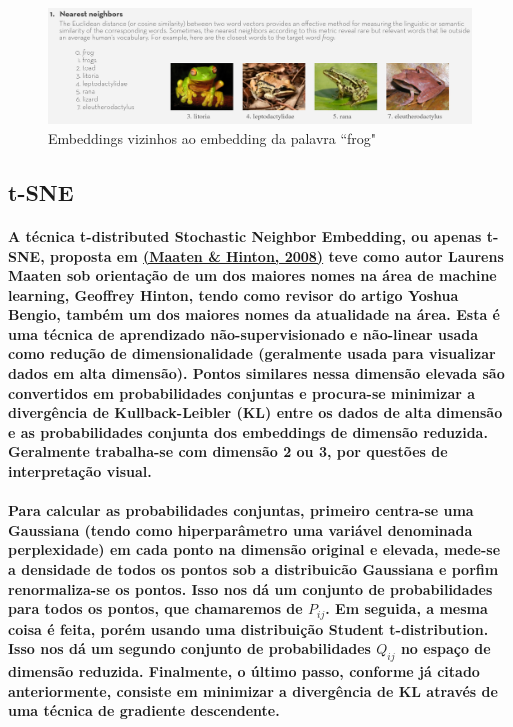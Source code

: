 \documentclass[a4paper]{article}    %
\begin{document}
\begin{figure}[H]
    \centering
    \includegraphics[width=15cm]{GloVe}
    \caption{Embeddings vizinhos ao embedding da palavra ``frog"}
    \label{fig:glove}
\end{figure}

\subsection{t-SNE}


\paragraph{A técnica t-distributed Stochastic Neighbor Embedding, ou apenas t-SNE, proposta em \href{https://github.com/ito-rafael/machine-learning/blob/master/papers/visualization/2008\%20-\%20\%5Bt-SNE\%5D\%20Visualizing\%20Data\%20using\%20t-SNE\%20\%5BUniversity\%20of\%20Toronto\%5D\%20(Maaten\%20\%26\%20Hinton\%2C\%202008).pdf}{(Maaten \& Hinton, 2008)} teve como autor Laurens Maaten sob orientação de um dos maiores nomes na área de machine learning, Geoffrey Hinton, tendo como revisor do artigo Yoshua Bengio, também um dos maiores nomes da atualidade na área. Esta é uma técnica de aprendizado não-supervisionado e não-linear usada como redução de dimensionalidade (geralmente usada para visualizar dados em alta dimensão). Pontos similares nessa dimensão elevada são convertidos em probabilidades conjuntas e procura-se minimizar a divergência de Kullback-Leibler (KL) entre os dados de alta dimensão e as probabilidades conjunta dos embeddings de dimensão reduzida. Geralmente trabalha-se com dimensão 2 ou 3, por questões de interpretação visual.}

\paragraph{Para calcular as probabilidades conjuntas, primeiro centra-se uma Gaussiana (tendo como hiperparâmetro uma variável denominada perplexidade) em cada ponto na dimensão original e elevada, mede-se a densidade de todos os pontos sob a distribuicão Gaussiana e porfim renormaliza-se os pontos. Isso nos dá um conjunto de probabilidades para todos os pontos, que chamaremos de $P_{ij}$. Em seguida, a mesma coisa é feita, porém usando uma distribuição Student t-distribution. Isso nos dá um segundo conjunto de probabilidades $Q_{ij}$ no espaço de dimensão reduzida. Finalmente, o último passo, conforme já citado anteriormente, consiste em minimizar a divergência de KL através de uma técnica de gradiente descendente.}
\end{document}

